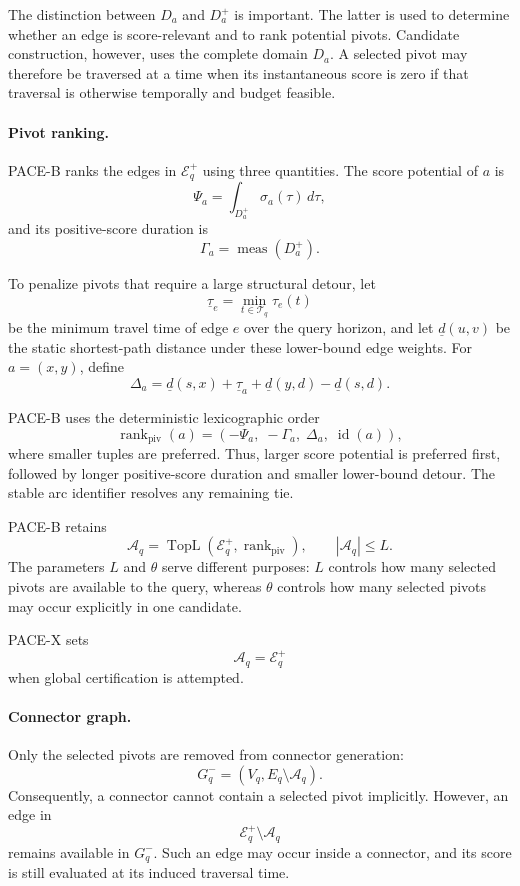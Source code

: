 \documentclass[a4paper,fleqn]{cas-dc}
\begin{document}
The distinction between \(D_a\) and \(D_a^{+}\) is important. The latter is
used to determine whether an edge is score-relevant and to rank potential
pivots. Candidate construction, however, uses the complete domain \(D_a\). A
selected pivot may therefore be traversed at a time when its instantaneous
score is zero if that traversal is otherwise temporally and budget feasible.

\paragraph{Pivot ranking.}
PACE-B ranks the edges in \(\mathcal{E}_q^{+}\) using three quantities. The
score potential of \(a\) is
\[
\Psi_a
=
\int_{D_a^{+}}\sigma_a(\tau)\,d\tau,
\]
and its positive-score duration is
\[
\Gamma_a
=
\operatorname{meas}(D_a^{+}).
\]

To penalize pivots that require a large structural detour, let
\[
\underline{\tau}_e
=
\min_{t\in\mathcal{T}_q}\tau_e(t)
\]
be the minimum travel time of edge \(e\) over the query horizon, and let
\(\underline d(u,v)\) be the static shortest-path distance under these
lower-bound edge weights. For \(a=(x,y)\), define
\[
\Delta_a
=
\underline d(s,x)
+
\underline{\tau}_a
+
\underline d(y,d)
-
\underline d(s,d).
\]

PACE-B uses the deterministic lexicographic order
\[
\operatorname{rank}_{\mathrm{piv}}(a)
=
\left(
-\Psi_a,\;
-\Gamma_a,\;
\Delta_a,\;
\operatorname{id}(a)
\right),
\]
where smaller tuples are preferred. Thus, larger score potential is preferred
first, followed by longer positive-score duration and smaller lower-bound
detour. The stable arc identifier resolves any remaining tie.

PACE-B retains
\[
\mathcal{A}_q
=
\operatorname{TopL}
\left(
\mathcal{E}_q^{+},
\operatorname{rank}_{\mathrm{piv}}
\right),
\qquad
|\mathcal A_q|\leq L.
\]
The parameters \(L\) and \(\theta\) serve different purposes:
\(L\) controls how many selected pivots are available to the query, whereas
\(\theta\) controls how many selected pivots may occur explicitly in one
candidate.

PACE-X sets
\[
\mathcal A_q=\mathcal E_q^{+}
\]
when global certification is attempted.

\paragraph{Connector graph.}
Only the selected pivots are removed from connector generation:
\[
G_q^{-}
=
(V_q,E_q\setminus\mathcal A_q).
\]
Consequently, a connector cannot contain a selected pivot implicitly.
However, an edge in
\[
\mathcal E_q^{+}\setminus\mathcal A_q
\]
remains available in \(G_q^{-}\). Such an edge may occur inside a connector,
and its score is still evaluated at its induced traversal time.
\end{document}

